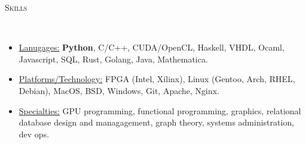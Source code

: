 \documentclass[9pt]{article}
\newenvironment{changemargin}[2]{%
  \begin{list}{}{%
    \setlength{\topsep}{0pt}%
    \setlength{\leftmargin}{#1}%
    \setlength{\rightmargin}{#2}%
    \setlength{\listparindent}{\parindent}%
    \setlength{\itemindent}{\parindent}%
    \setlength{\parsep}{\parskip}%
  }%
  \item[]}{\end{list}
}
\newcommand{\lineover}{
	\begin{changemargin}{-0.05in}{-0.05in}
		\vspace*{-8pt}
		\hrulefill \\
		\vspace*{-2pt}
	\end{changemargin}
}
\newcommand{\header}[1]{
	\begin{changemargin}{-0.5in}{-0.5in}
		\scshape{#1}\\
  	\lineover
	\end{changemargin}
}
\newenvironment{body} {
	\vspace*{-16pt}
	\begin{changemargin}{-0.25in}{-0.5in}
  }	
	{\end{changemargin}
}
\begin{document}
\smallskip

\header{Skills}
\smallskip
\begin{body}
	\vspace{14pt}
	\begin{itemize} \itemsep -0pt
	
	\item \uline{Lanugages:} \textbf{Python}, C/C++, CUDA/OpenCL, Haskell, VHDL, Ocaml, Javascript, SQL, Rust, Golang, Java, Mathematica.

	\item \uline{Platforms/Technology:} FPGA (Intel, Xilinx), Linux (Gentoo, Arch, RHEL, Debian), MacOS, BSD, Windows, Git, Apache, Nginx.
	\item \uline{Specialties:} GPU programming, functional programming, graphics, relational database design and managagement, graph theory, systems administration, dev ops.
	\end{itemize}
\end{body}
\end{document}
